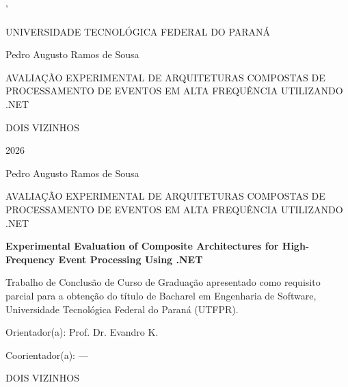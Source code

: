 '\documentclass[12pt]{article}
\title{\titulo}
\author{Pedro Augusto Ramos de Sousa \\\\ \email{pedro.sousa@utfpr.edu.br}}
\newcommand{\autor}{Pedro Augusto Ramos de Sousa}
\newcommand{\titulo}{Avaliação Experimental de Arquiteturas Compostas de Processamento de Eventos em Alta Frequência Utilizando .NET}
\newcommand{\tituloUppercase}{\MakeUppercase{\titulo}}
\newcommand{\titulotraduzido}{Experimental Evaluation of Composite Architectures for High-Frequency Event Processing Using .NET}
\newcommand{\orientador}{Prof. Dr. Evandro K.}
\newcommand{\coorientador}{---}
\newcommand{\ano}{\the\year{}}
\begin{document}


\begin{titlepage}
\centering
{\large UNIVERSIDADE TECNOLÓGICA FEDERAL DO PARANÁ \par}
\vspace*{4cm}
{\large Pedro Augusto Ramos de Sousa \par}
\vspace{6cm}
{\large AVALIAÇÃO EXPERIMENTAL DE ARQUITETURAS COMPOSTAS DE PROCESSAMENTO DE EVENTOS EM ALTA FREQUÊNCIA UTILIZANDO .NET \par}
\vspace*{\fill}
{\large DOIS VIZINHOS \par}
{\large 2026 \par}
\end{titlepage}

\newpage
\pagestyle{empty}

\begin{titlepage}
\centering
{\large \autor \par}
\vspace{6cm}
{\large \tituloUppercase \par}
\vspace{1cm}
{\large \textbf{\titulotraduzido} \par}
\vspace{4cm}

\hfill
\parbox[t]{9cm}{
\RaggedRight
Trabalho de Conclusão de Curso de Graduação apresentado como requisito parcial para a
obtenção do título de Bacharel em Engenharia de Software, Universidade Tecnológica Federal
do Paraná (UTFPR). \par
\vspace{0.5cm}
Orientador(a): \orientador \par
\vspace{0.3cm}
Coorientador(a): \coorientador \par
}

\vspace*{\fill}
{\large DOIS VIZINHOS \par}
{\large \ano \par}

\licencaBySa
\vspace{-1.5cm}
\end{titlepage}

\newpage
\pagestyle{empty}
\end{document}
